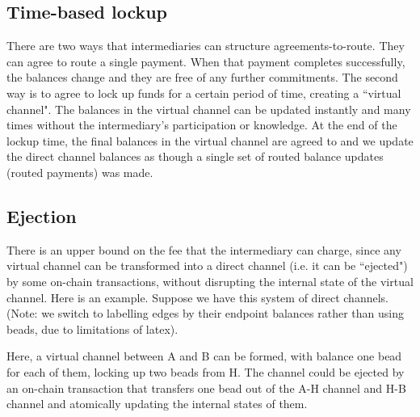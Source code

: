 \documentclass{article}
\begin{document}

\subsection*{Time-based lockup}

There are two ways that intermediaries can structure agreements-to-route. They can agree to route a single payment. When that payment completes successfully, the balances change and they are free of any further commitments. The second way is to agree to lock up funds for a certain period of time, creating a ``virtual channel". The balances in the virtual channel can be updated instantly and many times without the intermediary's participation or knowledge. At the end of the lockup time, the final balances in the virtual channel are agreed to and we update the direct channel balances as though a single set of routed balance updates (routed payments) was made.

\subsection*{Ejection}

There is an upper bound on the fee that the intermediary can charge, since any virtual channel can be transformed into a direct channel (i.e. it can be ``ejected") by some on-chain transactions, without disrupting the internal state of the virtual channel. Here is an example. Suppose we have this system of direct channels. (Note: we switch to labelling edges by their endpoint balances rather than using beads, due to limitations of latex).

\begin{figure}[H]
    \centering
\end{figure}

Here, a virtual channel between A and B can be formed, with balance one bead for each of them, locking up two beads from H. The channel could be ejected by an on-chain transaction that transfers one bead out of the A-H channel and H-B channel and atomically updating the internal states of them.
\end{document}
